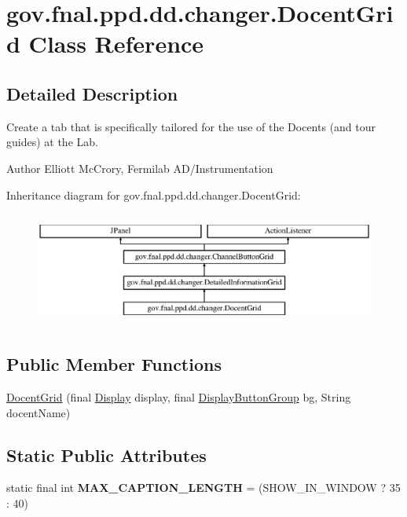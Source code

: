 \hypertarget{classgov_1_1fnal_1_1ppd_1_1dd_1_1changer_1_1DocentGrid}{\section{gov.\-fnal.\-ppd.\-dd.\-changer.\-Docent\-Grid Class Reference}
\label{classgov_1_1fnal_1_1ppd_1_1dd_1_1changer_1_1DocentGrid}
}


\subsection{Detailed Description}
Create a tab that is specifically tailored for the use of the Docents (and tour guides) at the Lab.

\begin{DoxyAuthor}{Author}
Elliott Mc\-Crory, Fermilab A\-D/\-Instrumentation 
\end{DoxyAuthor}
Inheritance diagram for gov.\-fnal.\-ppd.\-dd.\-changer.\-Docent\-Grid\-:\begin{figure}[H]
\begin{center}
\leavevmode
\includegraphics[height=3.783784cm]{classgov_1_1fnal_1_1ppd_1_1dd_1_1changer_1_1DocentGrid}
\end{center}
\end{figure}
\subsection*{Public Member Functions}
\begin{DoxyCompactItemize}
\item 
\hyperlink{classgov_1_1fnal_1_1ppd_1_1dd_1_1changer_1_1DocentGrid_a8d11fc4a2cae91c4b626b99ad1c8051a}{Docent\-Grid} (final \hyperlink{interfacegov_1_1fnal_1_1ppd_1_1dd_1_1signage_1_1Display}{Display} display, final \hyperlink{classgov_1_1fnal_1_1ppd_1_1dd_1_1util_1_1specific_1_1DisplayButtonGroup}{Display\-Button\-Group} bg, String docent\-Name)
\end{DoxyCompactItemize}
\subsection*{Static Public Attributes}
\begin{DoxyCompactItemize}
\item 
\hypertarget{classgov_1_1fnal_1_1ppd_1_1dd_1_1changer_1_1DocentGrid_aebf6698c77d6b3a216c185900f253373}{static final int {\bfseries M\-A\-X\-\_\-\-C\-A\-P\-T\-I\-O\-N\-\_\-\-L\-E\-N\-G\-T\-H} = (S\-H\-O\-W\-\_\-\-I\-N\-\_\-\-W\-I\-N\-D\-O\-W ? 35 \-: 40)}\label{classgov_1_1fnal_1_1ppd_1_1dd_1_1changer_1_1DocentGrid_aebf6698c77d6b3a216c185900f253373}

\end{DoxyCompactItemize}
